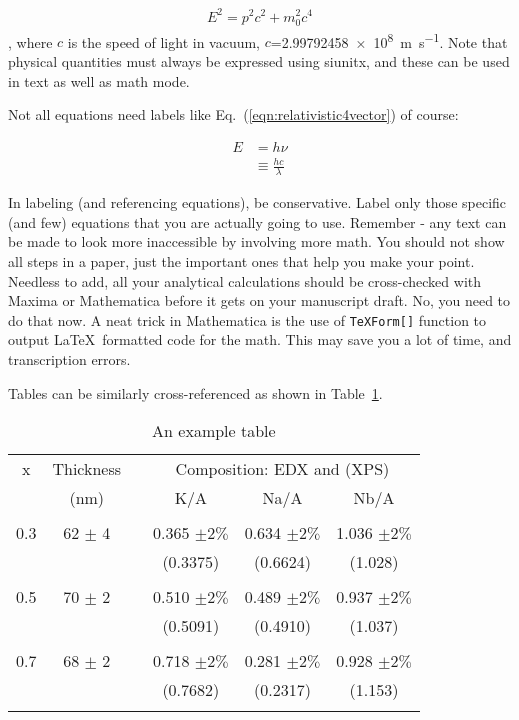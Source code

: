 \documentclass[12 pt]{article}
\begin{document}
\begin{align}
  E^{2} = p^{2} c^{2} + m_{0}^{2} c^{4} \label{eqn:relativistic4vector}
\end{align}
, where $c$ is the speed of light in vacuum, $c$=\qty{2.99792458e8}{\meter\per\second}. Note that physical quantities must always be expressed using siunitx, and these can be used in text as well as math mode.

Not all equations need labels like Eq.~(\ref{eqn:relativistic4vector}) of course:

\begin{align}
  E & = h\nu \nonumber \\
  & \equiv \frac{h c}{\lambda} \label{eqn:plancksrelationship}
\end{align}

In labeling (and referencing equations), be conservative. Label only those specific (and few) equations that you are actually going to use. Remember - any text can be made to look more inaccessible by involving more math. You should not show all steps in a paper, just the important ones that help you make your point. Needless to add, all your analytical calculations should be cross-checked with Maxima or Mathematica before it gets on your manuscript draft. No, you need to do that now. A neat trick in Mathematica is the use of \verb|TeXForm[]| function to output \LaTeX\ formatted code for the math. This may save you a lot of time, and transcription errors.

Tables can be similarly cross-referenced as shown in Table~\ref{tbl:ratio}.

\begin{table}
  \caption{An example table}
  \label{tbl:ratio}
  \begin{center}
    \begin{tabular}{cccccc}
      x  & Thickness & & \multicolumn{3}{c}{Composition: EDX and (XPS)} \\
         & (nm) & & K/A & Na/A & Nb/A \\
      \hline \\
      0.3 & 62 $\pm$ 4 & & 0.365 $\pm 2\%$ & 0.634 $\pm 2\%$ & 1.036 $\pm 2\%$ \\
         & & & (0.3375) & (0.6624) & (1.028) \\
      \hline \\
      0.5 & 70 $\pm$ 2 & & 0.510 $\pm 2\%$ & 0.489 $\pm 2\%$ & 0.937 $\pm 2\%$ \\
         & & & (0.5091) & (0.4910) & (1.037) \\
      \hline \\
      0.7 & 68 $\pm$ 2 & & 0.718 $\pm 2\%$ & 0.281 $\pm 2\%$ & 0.928 $\pm 2\%$ \\
         & & & (0.7682) & (0.2317) & (1.153) \\
      \hline \\
    \end{tabular}
  \end{center}
\end{table}
\end{document}
